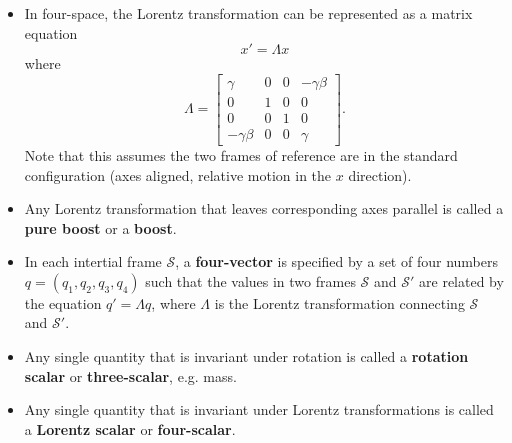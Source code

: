 \documentclass{article}
\begin{document}
\begin{itemize}
  \item In four-space, the Lorentz transformation can be represented as a matrix equation \[x' = \Lambda x\] where \[\Lambda = \begin{bmatrix}
            \gamma        & 0 & 0 & -\gamma \beta \\
            0             & 1 & 0 & 0             \\
            0             & 0 & 1 & 0             \\
            -\gamma \beta & 0 & 0 & \gamma
          \end{bmatrix}.\] Note that this assumes the two frames of reference are in the standard configuration (axes aligned, relative motion in the $x$ direction).

  \item Any Lorentz transformation that leaves corresponding axes parallel is called a \textbf{pure boost} or a \textbf{boost}.

  \item In each intertial frame $\mathcal{S}$, a \textbf{four-vector} is specified by a set of four numbers $q = (q_1, q_2, q_3, q_4)$ such that the values in two frames $\mathcal{S}$ and $\mathcal{S}'$ are related by the equation $q' = \Lambda q$, where $\Lambda$ is the Lorentz transformation connecting $\mathcal{S}$ and $\mathcal{S}'$.

  \item Any single quantity that is invariant under rotation is called a \textbf{rotation scalar} or \textbf{three-scalar}, e.g. mass.

  \item Any single quantity that is invariant under Lorentz transformations is called a \textbf{Lorentz scalar} or \textbf{four-scalar}.
\end{itemize}
\end{document}

